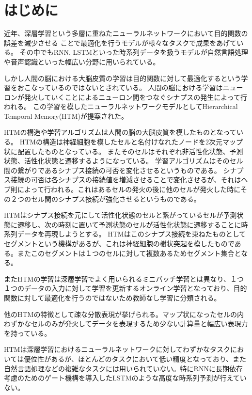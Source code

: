 \chapter{はじめに}
近年、深層学習という多層に重ねたニューラルネットワークにおいて目的関数の誤差を減少させる
ことで最適化を行うモデルが様々なタスクで成果をあげている。
その中でもRNN, LSTMといった時系列データを扱うモデルが自然言語処理や音声認識といった幅広い分野に用いられている。

しかし人間の脳における大脳皮質の学習は目的関数に対して最適化するという学習をおこなっているのではないとされている。\cite{neurons}
人間の脳における学習はニューロンが発火していくことによるニューロン間をつなぐシナプスの発生によって行われる。
この学習を模したニューラルネットワークモデルとしてHierarchical Temporal Memory(HTM)が提案された。\cite{htm}

HTMの構造や学習アルゴリズムは人間の脳の大脳皮質を模したものとなっている。
HTMの構造は神経細胞を模したセルと名付けなれたノードを2次元マップ状に配置したものとなっている。
またそのセルはそれぞれ非活性化状態、予測状態、活性化状態と遷移するようになっている。
学習アルゴリズムはそのセル間の繋がりであるシナプス接続の可否を変化させるというものである。
シナプス接続の可否は各シナプスの接続値を増減させることで変化させるが、それはヘブ則によって行われる。これはあるセルの発火の後に他のセルが発火した時にその２つのセル間のシナプス接続が強化させるというものである。

HTMはシナプス接続を元にして活性化状態のセルと繋がっているセルが予測状態に遷移し、次の時刻に置いて予測状態のセルが活性化状態に遷移することに時系列データを再現しようとする。
HTMはこのシナプス接続を束ねたものとしてセグメントという機構があるが、これは神経細胞の樹状突起を模したものである。またこのセグメントは１つのセルに対して複数あるためセグメント集合となる。

またHTMの学習は深層学習でよく用いられるミニバッチ学習とは異なり、１つ１つのデータの入力に対して学習を更新するオンライン学習となっており、目的関数に対して最適化を行うのではないため教師なし学習に分類される。

他のHTMの特徴として疎な分散表現が挙げられる。マップ状になったセルの内わずかなセルのみが発火してデータを表現するため少ない計算量と幅広い表現力を持っている。

HTMは深層学習におけるニューラルネットワークに対してわずかなタスクにおいては優位性があるが、ほとんどのタスクにおいて低い精度となっており、また自然言語処理などの複雑なタスクには用いられていない。特にRNNに長期依存考慮のためのゲート機構を導入したLSTMのような高度な時系列予測が行えていない。

